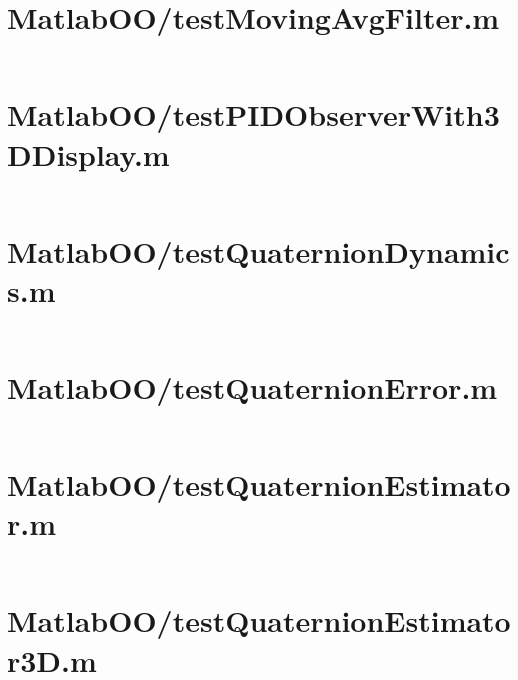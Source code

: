 \pagebreak
\section*{MatlabOO/testMovingAvgFilter.m}\label{code:MatlabOO/testMovingAvgFilter.m}
\inputminted[linenos,fontsize=\scriptsize]{matlab}{/home/dcouture/git/mathyourlife/TSatPy/beta_versions/matlab_object_oriented/testMovingAvgFilter.m}

\pagebreak
\section*{MatlabOO/testPIDObserverWith3DDisplay.m}\label{code:MatlabOO/testPIDObserverWith3DDisplay.m}
\inputminted[linenos,fontsize=\scriptsize]{matlab}{/home/dcouture/git/mathyourlife/TSatPy/beta_versions/matlab_object_oriented/testPIDObserverWith3DDisplay.m}

\pagebreak
\section*{MatlabOO/testQuaternionDynamics.m}\label{code:MatlabOO/testQuaternionDynamics.m}
\inputminted[linenos,fontsize=\scriptsize]{matlab}{/home/dcouture/git/mathyourlife/TSatPy/beta_versions/matlab_object_oriented/testQuaternionDynamics.m}

\pagebreak
\section*{MatlabOO/testQuaternionError.m}\label{code:MatlabOO/testQuaternionError.m}
\inputminted[linenos,fontsize=\scriptsize]{matlab}{/home/dcouture/git/mathyourlife/TSatPy/beta_versions/matlab_object_oriented/testQuaternionError.m}

\pagebreak
\section*{MatlabOO/testQuaternionEstimator.m}\label{code:MatlabOO/testQuaternionEstimator.m}
\inputminted[linenos,fontsize=\scriptsize]{matlab}{/home/dcouture/git/mathyourlife/TSatPy/beta_versions/matlab_object_oriented/testQuaternionEstimator.m}

\pagebreak
\section*{MatlabOO/testQuaternionEstimator3D.m}\label{code:MatlabOO/testQuaternionEstimator3D.m}
\inputminted[linenos,fontsize=\scriptsize]{matlab}{/home/dcouture/git/mathyourlife/TSatPy/beta_versions/matlab_object_oriented/testQuaternionEstimator3D.m}

